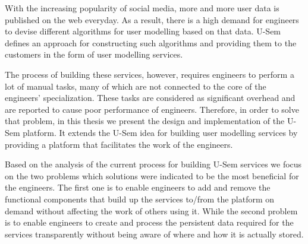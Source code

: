 With the increasing popularity of social media, more and more user data is published on the web everyday. As a result, there is a high demand for engineers to devise different algorithms for user modelling based on that data. U-Sem defines an approach for constructing such algorithms and providing them to the customers in the form of user modelling services.

The process of building these services, however, requires engineers to perform a lot of manual tasks, many of which are not connected to the core of the engineers' specialization. These tasks are considered as significant overhead and are reported to cause poor performance of engineers. Therefore, in order to solve that problem, in this thesis we present the design and implementation of the U-Sem platform. It extends the U-Sem idea for building user modelling services by providing a platform that facilitates the work of the engineers.

Based on the analysis of the current process for building U-Sem services we focus on the two problems which solutions were indicated to be the most beneficial for the engineers. The first one is to enable engineers to add and remove the functional components that build up the services to/from the platform on demand without affecting the work of others using it. While the second problem is to enable engineers to create and process the persistent data required for the services transparently without being aware of where and how it is actually stored.